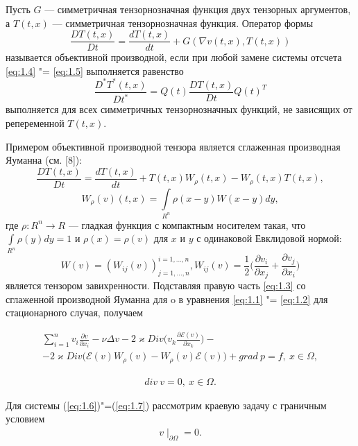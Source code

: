 \begin{definition}
    Пусть $G$ --- симметричная тензорнозначная функция двух тензорных аргументов, а $T(t, x)$ --- симметричная 
    тензорнозначная функция. Оператор формы
    $$\frac{DT(t,x)}{Dt}=\frac{dT(t,x)}{dt}+G(\nabla v(t,x),T(t,x))$$
    называется объективной производной, если при любой замене системы отсчета \ref{eq:1.4} "= \ref{eq:1.5} выполняется 
    равенство
    $$\frac{D^*T^*(t,x)}{Dt^*}=Q(t)\frac{DT(t,x)}{Dt}Q(t)^T$$
    выполняется для всех симметричных тензорнозначных функций, не зависящих от репеременной $T(t, x)$. 
\end{definition}

Примером объективной производной тензора является сглаженная производная Яуманна (см. [8]):
$$\frac{DT(t,x)}{Dt}=\frac{dT(t,x)}{dt}+T(t,x)W_{\rho}(t,x)-W_{\rho}(t,x)T(t,x), $$
$$W_{\rho}(v)(t,x)=\int\limits_{R^n}{\rho}(x-y)W(x-y)dy,$$
где $\rho: R^n\rightarrow R$ --- гладкая функция с компактным носителем такая, что $\int\limits_{R^n}\rho (y) dy = 1$
и $\rho(x) = \rho(v)$ для $x$ и $y$ с одинаковой Евклидовой нормой:
$$W(v)=(W_{ij}(v))^{i=1,...,n}_{j=1,...,n}, W_{ij}(v)=\frac{1}{2}\bigg(\frac{\partial v_i}{\partial x_j}+\frac{\partial v_j}{\partial x_i}\bigg)$$
является тензором завихренности. 
Подставляя правую часть \ref{eq:1.3} со сглаженной производной Яуманна для o в уравнения \ref{eq:1.1} "= \ref{eq:1.2} для 
стационарного случая, получаем

\begin{equation}\label{eq:1.6}
    \begin{gathered}
        \sum_{i=1}^n v_i\frac{\partial v}{\partial x_i}-\nu\Delta v- 2\varkappa Div\bigg(v_k\frac{\partial\mathcal{E}(v)}
        {\partial x_k}\bigg)-\\-2\varkappa Div\bigg(\mathcal{E}(v)W_{\rho}(v)-W_{\rho}(v)\mathcal{E}(v)\bigg)+grad \ p=f, \ x\in\Omega,
    \end{gathered}
\end{equation}

\begin{equation}\label{eq:1.7}
    \begin{gathered}
        div \ v=0, \ x\in\Omega.
    \end{gathered}
\end{equation}

Для системы (\ref{eq:1.6})"=(\ref{eq:1.7}) рассмотрим краевую задачу с граничным условием
\begin{equation}\label{eq:1.8}
     \begin{gathered}
         v\mid_{\partial\Omega}=0.
     \end{gathered}
\end{equation}

